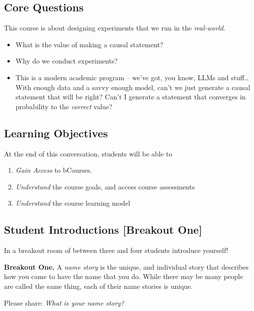\documentclass[
]{article}
\providecommand{\tightlist}{%
  \setlength{\itemsep}{0pt}\setlength{\parskip}{0pt}}
\theoremstyle{definition}
\theoremstyle{definition}
\theoremstyle{definition}
\theoremstyle{definition}
\theoremstyle{remark}
\begin{document}
\subsection{Core Questions}\label{core-questions}

This course is about designing experiments that we run in the \emph{real-world}.

\begin{itemize}
\tightlist
\item
  What is the value of making a causal statement?
\item
  Why do we conduct experiments?
\item
  This is a modern academic program -- we've got, you know, LLMs and stuff\ldots{} With enough data and a savvy enough model, can't we just generate a causal statement that will be right? Can't I generate a statement that converges in probability to the \emph{correct} value?
\end{itemize}

\subsection{Learning Objectives}\label{learning-objectives}

At the end of this conversation, students will be able to

\begin{enumerate}
\def\labelenumi{\arabic{enumi}.}
\tightlist
\item
  \emph{Gain Access} to bCourses.
\item
  \emph{Understand} the course goals, and access course assessments
\item
  \emph{Understand} the course learning model
\end{enumerate}

\subsection{Student Introductions {[}Breakout One{]}}\label{student-introductions-breakout-one}

In a breakout room of between three and four students introduce yourself!

\begin{breakout}
\textbf{Breakout One.} A \emph{name story} is the unique, and individual story that describes how you came to have the name that you do. While there may be many people are called the same thing, each of their name stories is unique.

Please share: \emph{What is your name story?}

\end{breakout}
\end{document}

